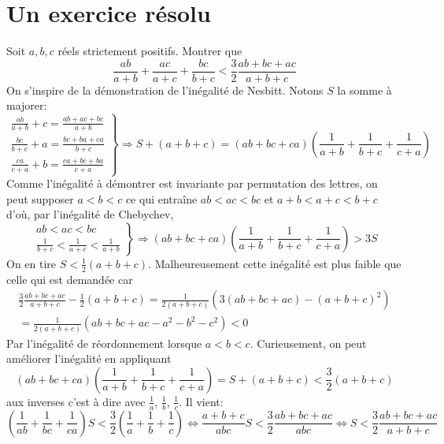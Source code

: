 \section{Un exercice résolu}
Soit $a, b, c$ réels strictement positifs. Montrer que 
\begin{displaymath}
  \frac{ab}{a+b} + \frac{ac}{a+c}+\frac{bc}{b+c} < \frac{3}{2}\frac{ab+bc+ac}{a+b+c}
\end{displaymath}
On s'inspire de la démonstration de l'inégalité de Nesbitt. Notons $S$ la somme à majorer:
\begin{displaymath}
\left. 
\begin{aligned}
  \frac{ab}{a+b} +c = \frac{ab + ac + bc}{a+b}\\
  \frac{bc}{b+c} +a = \frac{bc + ba + ca}{b+c}\\
  \frac{ca}{c+a} +b = \frac{ca + bc + ba}{c+a}  
\end{aligned}
\right\rbrace \Rightarrow
S + (a+b+c) = \left(ab+bc+ca \right) \left(\frac{1}{a+b}+\frac{1}{b+c}+\frac{1}{c+a} \right) 
\end{displaymath}
Comme l'inégalité à démontrer est invariante par permutation des lettres, on peut supposer $a<b<c$ ce qui entraîne $ab < ac < bc$ et $a+b < a+c < b+c$ d'où, par l'inégalité de Chebychev,
\begin{displaymath}
\left. 
\begin{aligned}
  ab < ac < bc\\
  \frac{1}{b+c} < \frac{1}{a+c} < \frac{1}{a+b}  
\end{aligned}
\right\rbrace \Rightarrow
\left(ab+bc+ca \right) \left(\frac{1}{a+b}+\frac{1}{b+c}+\frac{1}{c+a} \right) > 3S 
\end{displaymath}
On en tire $S < \frac{1}{2}(a+b+c)$. Malheureusement cette inégalité est plus faible que celle qui est demandée car
\begin{multline*}
  \frac{3}{2}\frac{ab+bc+ac}{a+b+c} - \frac{1}{2}(a+b+c)
  =\frac{1}{2(a+b+c)}\left( 3(ab+bc+ac)-(a+b+c)^2\right)\\
  =\frac{1}{2(a+b+c)}\left( ab+bc+ac-a^2 - b^2 -c^2\right) < 0
\end{multline*}
Par l'inégalité de réordonnement lorsque $a<b<c$.\newline
Curieusement, on peut améliorer l'inégalité en appliquant
\begin{displaymath}
\left(ab+bc+ca \right) \left(\frac{1}{a+b}+\frac{1}{b+c}+\frac{1}{c+a} \right) = S +(a+b+c) <\frac{3}{2}(a+b+c)  
\end{displaymath}
aux inverses c'est à dire avec $\frac{1}{a}$, $\frac{1}{b}$, $\frac{1}{c}$. Il vient:
\begin{displaymath}
\left(\frac{1}{ab}+\frac{1}{bc}+\frac{1}{ca} \right)S< \frac{3}{2}\left(  \frac{1}{a}+\frac{1}{b}+\frac{1}{c} \right) 
\Leftrightarrow
\frac{a+b+c}{abc} S < \frac{3}{2}\frac{ab+bc+ac}{abc}
\Leftrightarrow
S < \frac{3}{2}\frac{ab+bc+ac}{a+b+c}
\end{displaymath}


